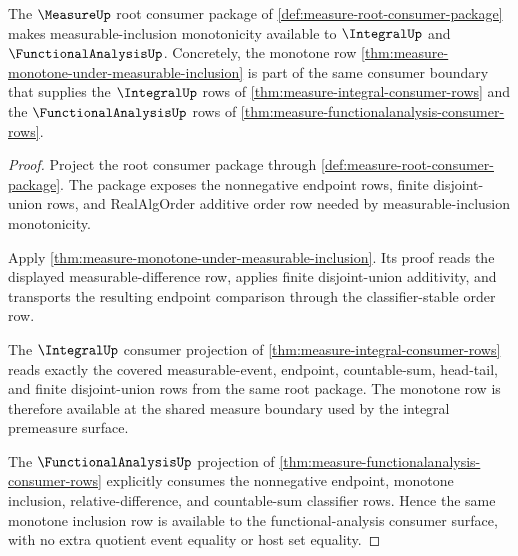 \begin{theorem}
\label{thm:measure-root-finite-monotone-consumer-package}
The $\MeasureUp$ root consumer package of
\autoref{def:measure-root-consumer-package} makes measurable-inclusion
monotonicity available to $\IntegralUp$ and $\FunctionalAnalysisUp$. Concretely,
the monotone row
\autoref{thm:measure-monotone-under-measurable-inclusion} is part of the same
consumer boundary that supplies the $\IntegralUp$ rows of
\autoref{thm:measure-integral-consumer-rows} and the $\FunctionalAnalysisUp$
rows of \autoref{thm:measure-functionalanalysis-consumer-rows}.
\end{theorem}
\begin{proof}
Project the root consumer package through
\autoref{def:measure-root-consumer-package}. The package exposes the
nonnegative endpoint rows, finite disjoint-union rows, and RealAlgOrder
additive order row needed by measurable-inclusion monotonicity.

Apply \autoref{thm:measure-monotone-under-measurable-inclusion}. Its proof
reads the displayed measurable-difference row, applies finite disjoint-union
additivity, and transports the resulting endpoint comparison through the
classifier-stable order row.

The $\IntegralUp$ consumer projection of
\autoref{thm:measure-integral-consumer-rows} reads exactly the covered
measurable-event, endpoint, countable-sum, head-tail, and finite
disjoint-union rows from the same root package. The monotone row is therefore
available at the shared measure boundary used by the integral premeasure
surface.

The $\FunctionalAnalysisUp$ projection of
\autoref{thm:measure-functionalanalysis-consumer-rows} explicitly consumes the
nonnegative endpoint, monotone inclusion, relative-difference, and
countable-sum classifier rows. Hence the same monotone inclusion row is
available to the functional-analysis consumer surface, with no extra quotient
event equality or host set equality.
\end{proof}

